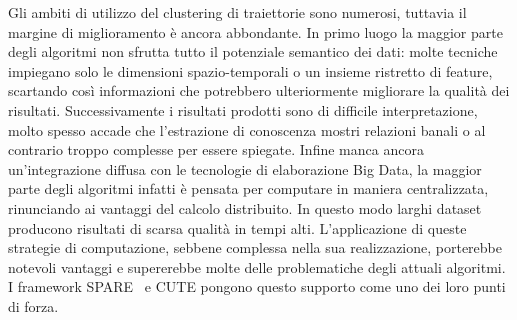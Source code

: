 Gli ambiti di utilizzo del clustering di traiettorie sono numerosi, tuttavia il margine di miglioramento
è ancora abbondante.
In primo luogo la maggior parte degli algoritmi non sfrutta tutto il potenziale semantico dei dati:
molte tecniche impiegano solo le dimensioni spazio-temporali o un insieme ristretto di feature,
scartando così informazioni che potrebbero ulteriormente migliorare la qualità dei risultati.
Successivamente i risultati prodotti sono di difficile interpretazione, molto spesso accade che
l'estrazione di conoscenza mostri relazioni banali o al contrario troppo complesse per essere spiegate.
Infine manca ancora un'integrazione diffusa con le tecnologie di elaborazione Big Data,
la maggior parte degli algoritmi infatti è pensata per computare in maniera centralizzata, rinunciando ai vantaggi del calcolo distribuito.
In questo modo larghi dataset producono risultati di scarsa qualità in tempi alti.
L'applicazione di queste strategie di computazione, sebbene complessa nella sua realizzazione, porterebbe
notevoli vantaggi e supererebbe molte delle problematiche degli attuali algoritmi.
I framework SPARE~\cite{DBLP:journals/pvldb/FanZWT16} e CUTE pongono questo
supporto come uno dei loro punti di forza.


